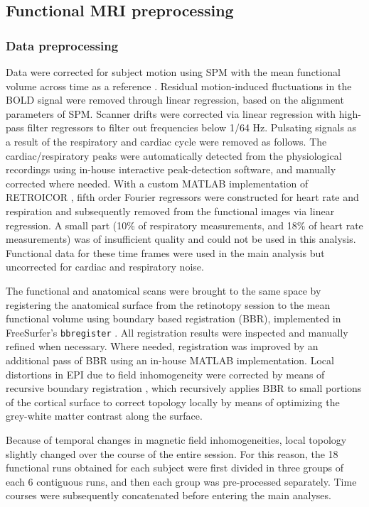 \subsection{Functional MRI preprocessing}
\subsubsection{Data preprocessing}
\label{sec:dataProcessing}
Data were corrected for subject motion using SPM with the mean functional volume across time as a reference \cite{Friston1995}. Residual motion-induced fluctuations in the BOLD signal were removed through linear regression, based on the alignment parameters of SPM. Scanner drifts were corrected via linear regression with high-pass filter regressors to filter out frequencies below 1/64 Hz. Pulsating signals as a result of the respiratory and cardiac cycle were removed as follows. The cardiac/respiratory peaks were automatically detected from the physiological recordings using in-house interactive peak-detection software, and manually corrected where needed. With a custom MATLAB implementation of RETROICOR \cite{Glover2000}, fifth order Fourier regressors were constructed for heart rate and respiration and subsequently removed from the functional images via linear regression. A small part (10\% of respiratory measurements, and 18\% of heart rate measurements) was of insufficient quality and could not be used in this analysis. Functional data for these time frames were used in the main analysis but uncorrected for cardiac and respiratory noise.

The functional and anatomical scans were brought to the same space by registering the anatomical surface from the retinotopy session to the mean functional volume using boundary based registration (BBR), implemented in FreeSurfer's \texttt{bbregister} \cite{Greve2009}. All registration results were inspected and manually refined when necessary. Where needed, registration was improved by an additional pass of BBR using an in-house MATLAB implementation. Local distortions in EPI due to field inhomogeneity were corrected by means of recursive boundary registration \cite{VanMourikISMRM2014}, which recursively applies BBR to small portions of the cortical surface to correct topology locally by means of optimizing the grey-white matter contrast along the surface.

Because of temporal changes in magnetic field inhomogeneities, local topology slightly changed over the course of the entire session. For this reason, the 18 functional runs obtained for each subject were first divided in three groups of each 6 contiguous runs, and then each group was pre-processed separately.  Time courses were subsequently concatenated before entering the main analyses.


